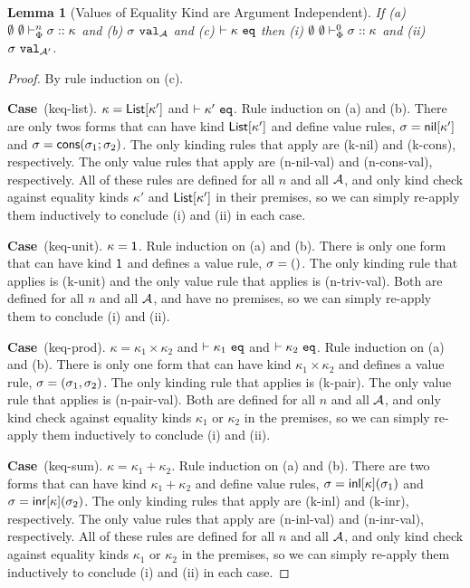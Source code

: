 \documentclass[12pt]{article}
\newtheorem{lemma}{Lemma}
\newcommand{\pfcase}[1]{\textbf{Case}~#1. }
\begin{document}
\begin{lemma}[Values of Equality Kind are Argument Independent]
\label{lemma:values-of-equality-kind-are-argument-independent}
If (a) $\emptyset~\emptyset \vdash_{\Phi}^{n} \sigma :: \kappa$ and (b) $\sigma~\mathtt{val}_{\mathcal{A}}$ and (c) $\vdash \kappa~\mathtt{eq}$ then (i) $\emptyset~\emptyset \vdash_{\Phi}^{0} \sigma :: \kappa$ and (ii) $\sigma~\mathtt{val}_{\mathcal{A}'}$.
\end{lemma}
\begin{proof}
By rule induction on (c).

\pfcase{(keq-list)} $\kappa={\sf List}[\kappa']$ and $\vdash \kappa'~\mathtt{eq}$. Rule induction on (a) and (b). There are only twos forms that can have kind ${\sf List}[\kappa']$ and define value rules, $\sigma={\sf nil}[\kappa']$ and $\sigma={\sf cons}(\sigma_1; \sigma_2)$. The only kinding rules that apply are (k-nil) and (k-cons), respectively. The only value rules that apply are (n-nil-val) and (n-cons-val), respectively. All of these rules are defined for all $n$ and all $\mathcal{A}$, and only kind check against equality kinds $\kappa'$ and ${\sf List}[\kappa']$ in their premises, so we can simply re-apply them inductively to conclude (i) and (ii) in each case.

\pfcase{(keq-unit)} $\kappa={\sf 1}$. Rule induction on (a) and (b). There is only one form that can have kind ${\sf 1}$ and defines a value rule, $\sigma=()$. The only kinding rule that applies is (k-unit) and the only value rule that applies is (n-triv-val). Both are defined for all $n$ and all $\mathcal{A}$, and have no premises, so we can simply re-apply them to conclude (i) and (ii).

\pfcase{(keq-prod)} $\kappa=\kappa_1\times\kappa_2$ and $\vdash \kappa_1~\mathtt{eq}$ and $\vdash \kappa_2~\mathtt{eq}$. Rule induction on (a) and (b). There is only one form that can have kind $\kappa_1\times\kappa_2$ and defines a value rule, $\sigma=(\sigma_1, \sigma_2)$. The only kinding rule that applies is (k-pair). The only value rule that applies is (n-pair-val). Both are defined for all $n$ and all $\mathcal{A}$, and only kind check against equality kinds $\kappa_1$ or $\kappa_2$ in the premises, so we can simply re-apply them inductively to conclude (i) and (ii).

\pfcase{(keq-sum)} $\kappa=\kappa_1+\kappa_2$. Rule induction on (a) and (b). There are two forms that can have kind $\kappa_1 + \kappa_2$ and define value rules, $\sigma={\sf inl}[\kappa](\sigma_1)$ and $\sigma={\sf inr}[\kappa](\sigma_2)$. The only kinding rules that apply are (k-inl) and (k-inr), respectively. The only value rules that apply are (n-inl-val) and (n-inr-val), respectively. All of these rules are defined for all $n$ and all $\mathcal{A}$, and only kind check against equality kinds $\kappa_1$ or $\kappa_2$ in the premises, so we can simply re-apply them inductively to conclude (i) and (ii) in each case.


\end{proof}
\end{document}
